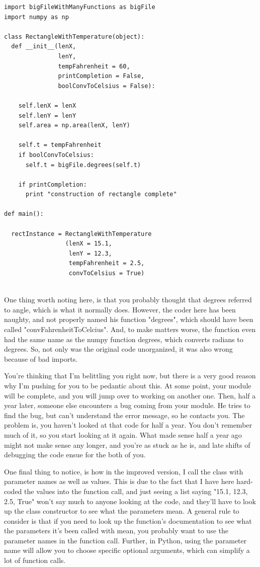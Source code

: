 \documentclass[10pt,a4paper]{article}
\begin{document}
\begin{lstlisting}
import bigFileWithManyFunctions as bigFile
import numpy as np

class RectangleWithTemperature(object):
  def __init__(lenX, 
               lenY, 
               tempFahrenheit = 60, 
               printCompletion = False,
               boolConvToCelsius = False):
               
    self.lenX = lenX
    self.lenY = lenY
    self.area = np.area(lenX, lenY)
		
    self.t = tempFahrenheit
    if boolConvToCelsius:
      self.t = bigFile.degrees(self.t)
    
    if printCompletion:
      print "construction of rectangle complete"

def main():

  rectInstance = RectangleWithTemperature
                 (lenX = 15.1, 
                  lenY = 12.3, 
                  tempFahrenheit = 2.5, 
                  convToCelsius = True)
	
\end{lstlisting}

One thing worth noting here, is that you probably thought that degrees referred to angle, which is what it normally does. However, the coder here has been naughty, and not properly named his function "degrees", which should have been called "convFahrenheitToCelcius". And, to make matters worse, the function even had the same name as the numpy function degrees, which converts radians to degrees. So, not only was the original code unorganized, it was also wrong because of bad imports.

You're thinking that I'm belittling you right now, but there is a very good reason why I'm pushing for you to be pedantic about this. At some point, your module will be complete, and you will jump over to working on another one. Then, half a year later, someone else encounters a bug coming from your module. He tries to find the bug, but can't understand the error message, so he contacts you. The problem is, you haven't looked at that code for half a year. You don't remember much of it, so you start looking at it again. What made sense half a year ago might not make sense any longer, and you're as stuck as he is, and late shifts of debugging the code ensue for the both of you. 

One final thing to notice, is how in the improved version, I call the class with parameter names as well as values. This is due to the fact that I have here hard-coded the values into the function call, and just seeing a list saying "15.1, 12.3, 2.5, True" won't say much to anyone looking at the code, and they'll have to look up the class constructor to see what the parameters mean. A general rule to consider is that if you need to look up the function's documentation to see what the parameters it's been called with mean, you probably want to use the parameter names in the function call. Further, in Python, using the parameter name will allow you to choose specific optional arguments, which can simplify a lot of function calls.
\end{document}
